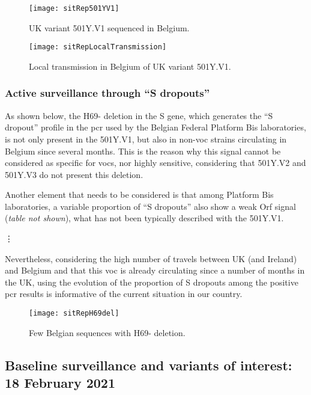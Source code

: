 \begin{figure}[ht]
  \centering
  \texttt{[image: sitRep501YV1]}
  \caption[UK variant 501Y.V1 sequenced in Belgium]{UK variant 501Y.V1 sequenced in Belgium.}
  \label{fig:sitRep501YV1}
\end{figure}

\begin{figure}[ht]
  \centering
  \texttt{[image: sitRepLocalTransmission]}
  \caption[Local transmission in Belgium of UK variant 501Y.V1]{Local transmission in Belgium of UK variant 501Y.V1.}
  \label{fig:sitRepLocalTransmission}
\end{figure}

\subsubsection{Active surveillance through ``S dropouts''}
As shown below, the H69- deletion in the S gene, which generates the ``S dropout'' profile in the \gls{pcr} used by the Belgian Federal Platform Bis laboratories, is not only present in the 501Y.V1, but also in non-\gls{voc} strains circulating in Belgium since several months.
This is the reason why this signal cannot be considered as specific for \gls{voc}s, nor highly sensitive, considering that 501Y.V2 and 501Y.V3 do not present this deletion.

Another element that needs to be considered is that among Platform Bis laboratories, a variable proportion of ``S dropouts'' also show a weak Orf signal (\textit{table not shown}), what has not been typically described with the 501Y.V1.

\vdots

Nevertheless, considering the high number of travels between UK (and Ireland) and Belgium and that this \gls{voc} is already circulating since a number of months in the UK, using the evolution of the proportion of S dropouts among the positive \gls{pcr} results is informative of the current situation in our country.

\begin{figure}[ht]
  \centering
  \texttt{[image: sitRepH69del]}
  \caption[Few Belgian sequences with H69- deletion]{Few Belgian sequences with H69- deletion.}
  \label{fig:sitRepH69del}
\end{figure}

\subsection{Baseline surveillance and variants of interest: 18 February 2021}
